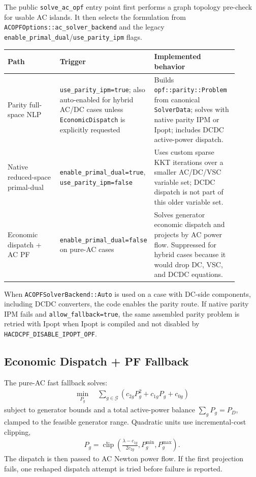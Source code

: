 The public \texttt{solve\_ac\_opf} entry point first performs a graph topology
pre-check for usable AC islands.  It then selects the formulation from
\texttt{ACOPFOptions::ac\_solver\_backend} and the legacy
\texttt{enable\_primal\_dual}/\texttt{use\_parity\_ipm} flags.

\begin{longtable}{L{0.25\linewidth}L{0.28\linewidth}L{0.37\linewidth}}
\toprule
Path & Trigger & Implemented behavior \\
\midrule
\endhead
Parity full-space NLP &
\texttt{use\_parity\_ipm=true}; also auto-enabled for hybrid AC/DC cases unless
\texttt{EconomicDispatch} is explicitly requested &
Builds \texttt{opf::parity::Problem} from canonical \texttt{SolverData}; solves
with native parity IPM or Ipopt; includes DCDC active-power dispatch. \\
Native reduced-space primal-dual &
\texttt{enable\_primal\_dual=true}, \texttt{use\_parity\_ipm=false} &
Uses custom sparse KKT iterations over a smaller AC/DC/VSC variable set; DCDC
dispatch is not part of this older variable set. \\
Economic dispatch + AC PF &
\texttt{enable\_primal\_dual=false} on pure-AC cases &
Solves generator economic dispatch and projects by AC power flow.  Suppressed
for hybrid cases because it would drop DC, VSC, and DCDC equations. \\
\bottomrule
\end{longtable}

When \texttt{ACOPFSolverBackend::Auto} is used on a case with DC-side
components, including DCDC converters, the code enables the parity route.  If
native parity IPM fails and
\texttt{allow\_fallback=true}, the same assembled parity problem is retried with
Ipopt when Ipopt is compiled and not disabled by
\texttt{HACDCPF\_DISABLE\_IPOPT\_OPF}.

\subsection{Economic Dispatch + PF Fallback}

The pure-AC fast fallback solves:
\begin{align}
\min_{P_g}\quad
\sum_{g\in\mathcal{G}}\left(c_{2g}P_g^2+c_{1g}P_g+c_{0g}\right)
\end{align}
subject to generator bounds and a total active-power balance
\(\sum_g P_g=P_D\), clamped to the feasible generator range.  Quadratic units
use incremental-cost clipping,
\begin{align}
P_g=\operatorname{clip}\left(\frac{\lambda-c_{1g}}{2c_{2g}},
P_g^{\min},P_g^{\max}\right).
\end{align}
The dispatch is then passed to AC Newton power flow.  If the first projection
fails, one reshaped dispatch attempt is tried before failure is reported.

